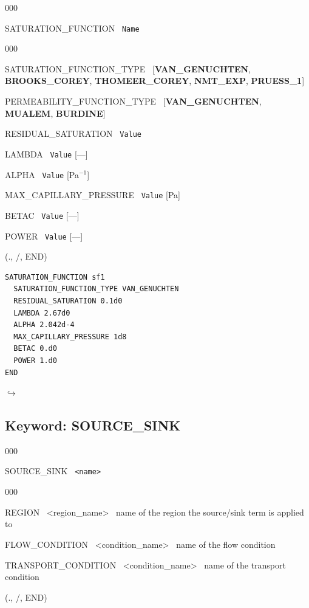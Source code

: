 \documentclass[12pt]{article}
\newcommand\return{{\hfill$\hookrightarrow$}}
\begin{document}
\begin{deflist}{000}
\item[SATURATION\_FUNCTION] \ {\tt Name}

\begin{deflist}{000}
\item[SATURATION\_FUNCTION\_TYPE] \ [{\bf VAN\_GENUCHTEN}, {\bf BROOKS\_COREY}, {\bf THOMEER\_COREY}, {\bf NMT\_EXP}, {\bf PRUESS\_1}]
\item[PERMEABILITY\_FUNCTION\_TYPE] \ [{\bf VAN\_GENUCHTEN}, {\bf MUALEM}, {\bf BURDINE}]
\item[RESIDUAL\_SATURATION] \ {\tt Value}
\item[LAMBDA] \ {\tt Value} [---]
\item[ALPHA] \ {\tt Value} [Pa$^{-1}$]
\item[MAX\_CAPILLARY\_PRESSURE] \ {\tt Value} [Pa]
\item[BETAC] \ {\tt Value} [---]
\item[POWER] \ {\tt Value} [---]
\end{deflist}
\item[(., /, END)]
\end{deflist}


\begin{verbatim}
SATURATION_FUNCTION sf1
  SATURATION_FUNCTION_TYPE VAN_GENUCHTEN
  RESIDUAL_SATURATION 0.1d0
  LAMBDA 2.67d0
  ALPHA 2.042d-4
  MAX_CAPILLARY_PRESSURE 1d8
  BETAC 0.d0
  POWER 1.d0
END
\end{verbatim}

\hyperlink{target_key}{\return}


\newpage
\protect\hypertarget{target_src}{}

\subsection{Keyword: SOURCE\_SINK}
\begin{deflist}{000}
\item[SOURCE\_SINK] \ {\tt <name>}
\begin{deflist}{000}
\item[REGION] \ <region\_name> \ name of the region the source/sink term is applied to
\item[FLOW\_CONDITION] \ <condition\_name> \ name of the flow condition
\item[TRANSPORT\_CONDITION] \ <condition\_name> \ name of the transport condition
\end{deflist}
\item[(., /, END)]
\end{deflist}
\end{document}
